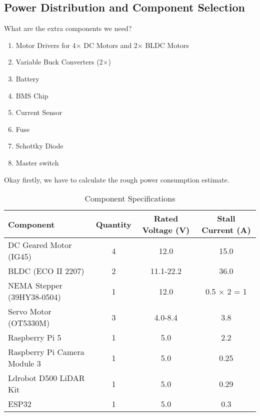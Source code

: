 \documentclass[12pt]{article}
\begin{document}
\subsection*{Power Distribution and Component Selection}
What are the extra components we need?
\begin{enumerate}
    \item Motor Drivers for 4$\times$ DC Motors and 2$\times$ BLDC Motors
    \item Variable Buck Converters (2$\times$)
    \item Battery
    \item BMS Chip
    \item Current Sensor
    \item Fuse
    \item Schottky Diode
    \item Master switch
\end{enumerate}

Okay firstly, we have to calculate the rough power consumption estimate.

\begin{table}[h]
\centering
\begin{tabular}{|l|c|c|c|}
\hline
\textbf{Component} & \textbf{Quantity} & \textbf{Rated Voltage (V)} & \textbf{Stall Current (A)} \\
\hline
DC Geared Motor (IG45) & 4 & 12.0 & 15.0 \\
\hline
BLDC (ECO II 2207) & 2 & 11.1-22.2 & 36.0 \\
\hline
NEMA Stepper (39HY38-0504) & 1 & 12.0 & 0.5 $\times$ 2 = 1 \\
\hline
Servo Motor (OT5330M) & 3 & 4.0-8.4 & 3.8 \\
\hline
Raspberry Pi 5 & 1 & 5.0 & 2.2 \\
\hline
Raspberry Pi Camera Module 3 & 1 & 5.0 & 0.25 \\
\hline
Ldrobot D500 LiDAR Kit & 1 & 5.0 & 0.29 \\
\hline
ESP32 & 1 & 5.0 & 0.3 \\
\hline
\end{tabular}
    \caption{Component Specifications}
\end{table}
\end{document}

